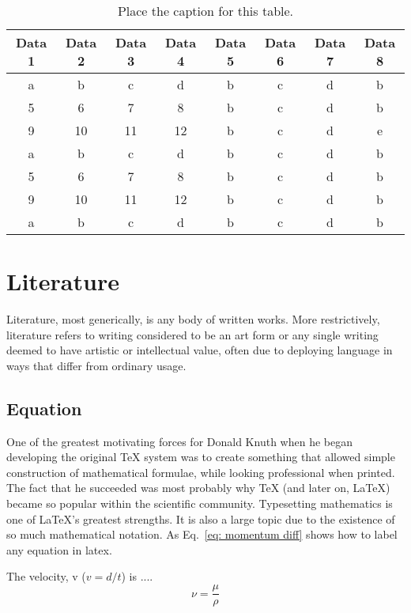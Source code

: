 \documentclass[11pt, a4paper]{article}
\begin{document}
\begin{table}
	\centering
	\caption{Place the caption for this table.}
	\label{tab:sample2}
	\renewcommand{\arraystretch}{1.5}
	\begin{tabular*}{\linewidth}{c @{\extracolsep{\fill}} ccccccc}
		\hline 
		Data 1 & Data 2 & Data 3 & Data 4 & Data 5 & Data 6 & Data 7 & Data 8\\ \hline
		a & b & c & d & b & c & d & b \\ 
		5 & 6 & 7 & 8 & b & c & d & b \\ 
		9 & 10 & 11 & 12 & b  & c & d & e \\ 
		a & b & c & d & b & c & d & b \\ 
		5 & 6 & 7 & 8 & b & c & d & b \\ 
		9 & 10 & 11 & 12 & b & c  & d & b \\ 
		a & b & c & d & b & c & d & b \\ \hline 
	\end{tabular*} 
\end{table}

\section{Literature}\label{sec:lit}
Literature, most generically, is any body of written works. More restrictively, literature refers to writing considered to be an art form or any single writing deemed to have artistic or intellectual value, often due to deploying language in ways that differ from ordinary usage.

\subsection{Equation}
One of the greatest motivating forces for Donald Knuth when he began developing the original TeX system was to create something that allowed simple construction of mathematical formulae, while looking professional when printed. The fact that he succeeded was most probably why TeX (and later on, LaTeX) became so popular within the scientific community. Typesetting mathematics is one of LaTeX's greatest strengths. It is also a large topic due to the existence of so much mathematical notation. As Eq.~\ref{eq: momentum diff} shows how to label any equation in latex. 

The velocity, v ($v=d/t$) is ....
%
\begin{equation}\label{eq: momentum diff}
\nu = \frac{\mu}{\rho}
\end{equation}
\end{document}
